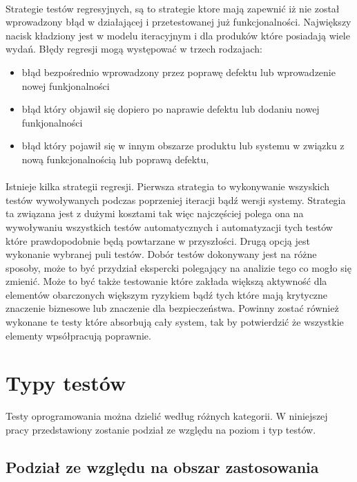 \paragraph{}
Strategie testów regresyjnych, są to strategie ktore mają zapewnić iż nie został wprowadzony błąd w działającej i przetestowanej już funkcjonalności. Największy nacisk kładziony jest w modelu iteracyjnym i dla produków które posiadają wiele wydań. Błędy regresji mogą występować w trzech rodzajach:
\begin{itemize}
  \item błąd bezpośrednio wprowadzony przez poprawę defektu lub wprowadzenie nowej funkjonalności
  \item błąd który objawił się dopiero po naprawie defektu lub dodaniu nowej funkjonalności
  \item  błąd który pojawił się w innym obszarze produktu lub systemu w związku z nową funkcjonalnością lub poprawą defektu,
\end{itemize}

\paragraph{}
Istnieje kilka strategii regresji. Pierwsza strategia to wykonywanie wszyskich testów wywoływanych podczas poprzeniej iteracji bądź wersji systemy. Strategia ta związana jest z dużymi kosztami tak więc najczęściej polega ona na wywoływaniu wszystkich testów automatycznych i automatyzacji tych testów które prawdopodobnie będą powtarzane w przyszłości. Drugą opcją jest wykonanie wybranej puli testów. Dobór testów dokonywany jest na różne sposoby, może to być przydział ekspercki polegający na analizie tego co mogło się zmienić. Może to być także testowanie które zakłada większą aktywność dla elementów obarczonych większym ryzykiem bądź tych które mają krytyczne znaczenie biznesowe lub znaczenie dla bezpieczeństwa. Powinny zostać również wykonane te testy które absorbują cały system, tak by potwierdzić że wszystkie elementy wpsółpracują poprawnie.

\section{Typy testów}
Testy oprogramowania można dzielić według różnych kategorii. W niniejszej pracy przedstawiony zostanie podział ze względu na poziom i typ testów.
 
\subsection{Podział ze względu na obszar zastosowania}
